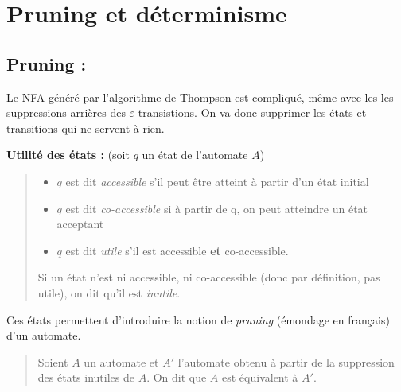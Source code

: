 \documentclass{article}
\begin{document}
\section{Pruning et déterminisme}
\subsection{Pruning :}
Le NFA généré par l'algorithme de Thompson est compliqué, même avec les les suppressions arrières des $\varepsilon$-transistions. On va donc supprimer les états et transitions qui ne servent à rien.\newline\newline

\textbf{Utilité des états :} (soit $q$ un état de l'automate $A$)
\begin{quote}
    \begin{itemize}
        \item $q$ est dit \textit{accessible} s'il peut être atteint à partir d'un état initial
        \item $q$ est dit \textit{co-accessible} si à partir de q, on peut atteindre un état acceptant
        \item $q$ est dit \textit{utile} s'il est accessible \textbf{et} co-accessible.\newline
    \end{itemize}
    Si un état n'est ni accessible, ni co-accessible (donc par définition, pas utile), on dit qu'il est \textit{inutile}. 
\end{quote}

Ces états permettent d'introduire la notion de \textit{pruning} (émondage en français) d'un automate.
\begin{quote}
    Soient $A$ un automate et $A'$ l'automate obtenu à partir de la suppression des états inutiles de $A$. On dit que $A$ est équivalent à $A'$.
\end{quote}
\end{document}
